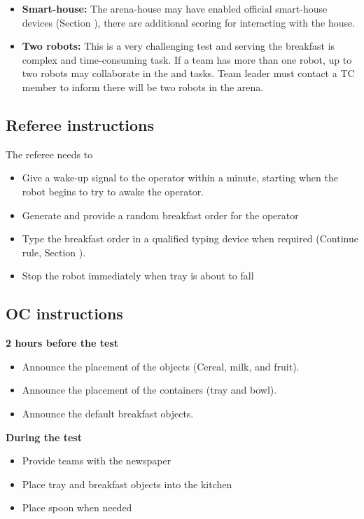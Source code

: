 \begin{itemize}
	\item \textbf{Smart-house:} The arena-house may have enabled official smart-house devices (Section ), there are additional scoring for interacting with the house.

	\item \textbf{Two robots:} This is a very challenging test and serving the breakfast is complex and time-consuming task. If a team has more than one robot, up to two robots may collaborate in the  and  tasks. Team leader must contact a TC member to inform there will be two robots in the arena.
\end{itemize}

\subsection{Referee instructions}

The referee needs to
\begin{itemize}
	\item Give a wake-up signal to the operator within a minute, starting when the robot begins to try to awake the operator.
	\item Generate and provide a random breakfast order for the operator
	\item Type the breakfast order in a qualified typing device when required (Continue rule, Section ).
	\item Stop the robot immediately when tray is about to fall
\end{itemize}

\subsection{OC instructions}

\textbf{2 hours before the test}
\begin{itemize}
	\item Announce the placement of the objects (Cereal, milk, and fruit).
	\item Announce the placement of the containers (tray and bowl).
	\item Announce the default breakfast objects.
\end{itemize}

\textbf{During the test}
\begin{itemize}
	\item Provide teams with the newspaper
	\item Place tray and breakfast objects into the kitchen
	\item Place spoon when needed
\end{itemize}

